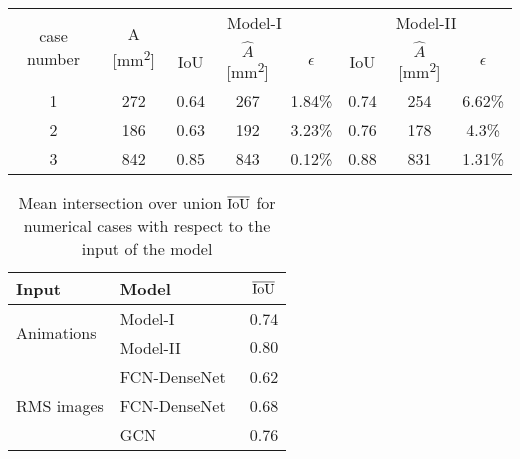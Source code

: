 \begin{sloppypar}
\begin{table}[ht!]
		\begin{tabular}{cccccccc}
			\toprule
			\multirow{2}{*}{case number} & \multicolumn{1}{c}{\multirow{2}{*}{A [mm\textsuperscript{2}]}} & \multicolumn{3}{c}{Model-I} & \multicolumn{3}{c}{Model-II} \\ \cmidrule(lr){3-5} \cmidrule(lr){6-8} 
			& \multicolumn{1}{c}{}  & \multicolumn{1}{c}{IoU}  & \multicolumn{1}{c}{\(\hat{A}\) [mm\textsuperscript{2}]} & \(\epsilon\) & \multicolumn{1}{c}{IoU}  & \multicolumn{1}{c}{\(\hat{A}\) [mm\textsuperscript{2}]} & \(\epsilon\) \\ 
			\midrule
			1 & 272 & \multicolumn{1}{c}{0.64} & \multicolumn{1}{c}{267} & 1.84\% & \multicolumn{1}{c}{0.74} & \multicolumn{1}{c}{254} & 6.62\% \\ 
			2 &  186  & \multicolumn{1}{c}{0.63} & \multicolumn{1}{c}{192} & 3.23\% & \multicolumn{1}{c}{0.76} & \multicolumn{1}{c}{178} & 4.3\% \\ 
			3 & 842 & \multicolumn{1}{c}{0.85} &\multicolumn{1}{c}{843} & 0.12\%   & \multicolumn{1}{c}{0.88} & \multicolumn{1}{c}{831} & 1.31\% \\ 
			\bottomrule
		\end{tabular}	
		\label{tab:num_cases}
	\end{table}

	\begin{table}[ht!]
		\centering
		\caption{Mean intersection over union $\overline{\textup{IoU}}$ for numerical cases with respect to the input of the model}
		\begin{tabular}{llc}
			\toprule
			Input & Model & $\overline{\textup{IoU}}$ \\ 
			\midrule
			\multirow{2}{*}{Animations} & Model-I & 0.74 \\ & Model-II                    & \(0.80\)    \\ \midrule
			\multirow{3}{*}{RMS images}  & FCN-DenseNet~\cite{Ijjeh2021} & 0.62     \\
			& FCN-DenseNet~\cite{Ijjeh2022} & 0.68     \\
			& GCN~\cite{Ijjeh2022}          & 0.76     \\ 
			\bottomrule
		\end{tabular}
		\label{tab:meanIoU_vs_input}
	\end{table}

	
	\clearpage

\end{sloppypar}
